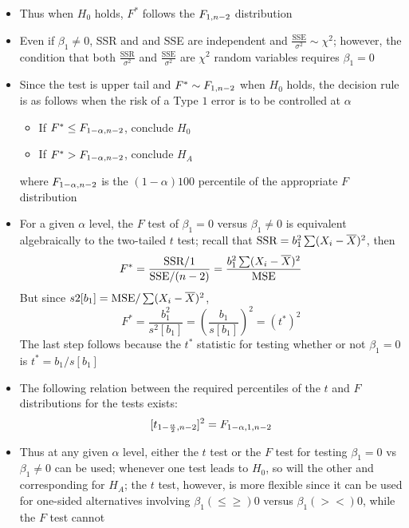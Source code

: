 \begin{itemize}
\item Thus when $H_0$ holds, $F^*$ follows the $F_{1, n-2}$ distribution 
\item Even if $\beta_1 \neq 0$, SSR and and SSE are independent and $\frac{\text{SSE}}{\sigma^2} \sim \chi^2$; however, the condition that both $\frac{\text{SSR}}{\sigma^2}$ and $\frac{\text{SSE}}{\sigma^2}$ are $\chi^2$ random variables requires $\beta_1 = 0$
\item Since the test is upper tail and $F^* \sim F_{1, n-2}$ when $H_0$ holds, the decision rule is as follows when the risk of a Type $1$ error is to be controlled at $\alpha$ \begin{itemize}
\item If $F^* \leq F_{1-\alpha, n-2}$, conclude $H_0$
\item If $F^* > F_{1-\alpha, n-2}$, conclude $H_A$ \end{itemize} where $F_{1-\alpha, n-2}$ is the $(1-\alpha)100$ percentile of the appropriate $F$ distribution 
\item For a given $\alpha$ level, the $F$ test of $\beta_1 = 0$ versus $\beta_1 \neq 0$ is equivalent algebraically to the two-tailed $t$ test; recall that $\text{SSR} = b_1^2 \sum (X_i - \overline{X})^2$, then
$$ F^* = \frac{\text{SSR} / 1}{\text{SSE} / (n-2)} = \frac{b_1^2 \sum (X_i - \overline{X})^2}{\text{MSE}} $$ But since $s2[b_1] = \text{MSE}/ \sum (X_i - \overline{X})^2$, $$ F^* = \frac{b_1^2}{s^2[b_1]} = \left( \frac{b_1}{s[b_1]}\right)^2 = (t^*)^2 $$ The last step follows because the $t^*$ statistic for testing whether or not $\beta_1 =0$ is $t^* = b_1 / s[b_1]$
\item The following relation between the required percentiles of the $t$ and $F$ distributions for the tests exists: $$ [t_{1-\frac{\alpha}{2}, n-2}]^2 = F_{1-\alpha, 1, n-2} $$ 
\item Thus at any given $\alpha$ level, either the $t$ test or the $F$ test for testing $\beta_1 = 0$ vs $\beta_1 \neq 0$ can be used; whenever one test leads to $H_0$, so will the other and corresponding for $H_A$; the $t$ test, however, is more flexible since it can be used for one-sided alternatives involving $\beta_1 (\leq \geq) 0$ versus $\beta_1 (> <) 0$, while the $F$ test cannot
\end{itemize}

